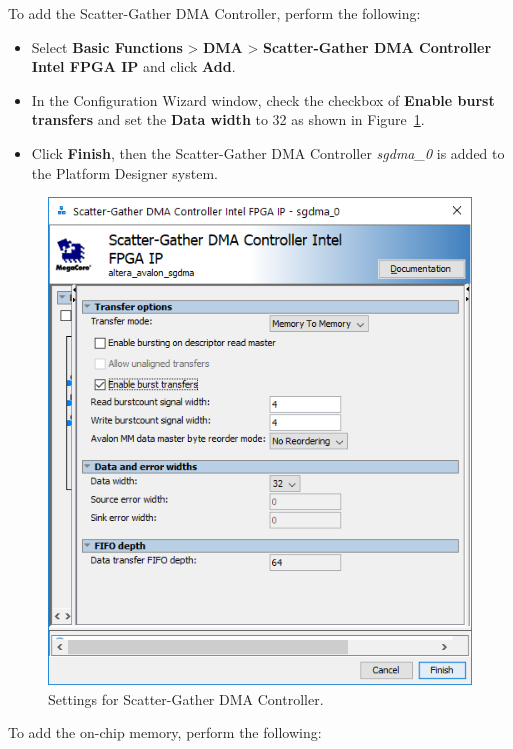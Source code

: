 \documentclass[11pt, twoside, pdftex]{article}
\begin{document}
To add the Scatter-Gather DMA Controller, perform the following: 

\begin{itemize}
	\item Select {\bf Basic Functions} > {\bf DMA} > {\bf Scatter-Gather DMA Controller Intel FPGA IP} and click {\bf Add}.
	\item In the Configuration Wizard window, check the checkbox of {\bf Enable burst transfers} and set the {\bf Data width} to 32 as shown in Figure~\ref{fig:sgdma_settings}.
	\item Click {\bf Finish}, then the Scatter-Gather DMA Controller {\it sgdma\_0} is added to the Platform Designer system.
\end{itemize}

\begin{figure}[H]
	\centering
	  \includegraphics[scale=0.65]{figures/sgdma_settings.png}
	\caption{Settings for Scatter-Gather DMA Controller.} 
	\label{fig:sgdma_settings}
\end{figure}

To add the on-chip memory, perform the following:
\end{document}
